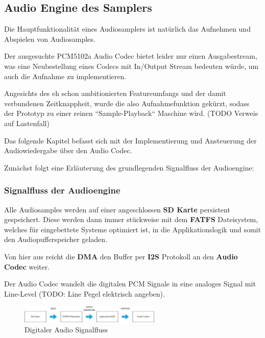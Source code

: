 



\subsection{Audio Engine des Samplers}


Die Hauptfunktionalität eines Audiosamplers ist natürlich das Aufnehmen und Abspielen von Audiosamples. 

Der ausgesuchte PCM5102a Audio Codec bietet leider nur einen Ausgabestream, was eine Neubestellung eines Codecs mit In/Output Stream bedeuten würde, um auch die Aufnahme zu implementieren.

Angesichts des eh schon ambitionierten Featureumfangs und der damit verbundenen Zeitknappheit, wurde die also Aufnahmefunktion gekürzt, sodass der Prototyp zu einer reinen ``Sample-Playback`` Maschine wird. (TODO Verweis auf Lastenfall)


Das folgende Kapitel befasst sich mit der Implementierung und Ansteuerung der Audiowiedergabe über den Audio Codec.

Zunächst folgt eine Erläuterung des grundlegenden Signalfluss der Audioengine:

\subsubsection{Signalfluss der Audioengine}

Alle Audiosamples werden auf einer angeschlossen \textbf{SD Karte} persistent gespeichert. Diese werden dann immer stückweise mit dem \textbf{FATFS} Dateisystem, welches für eingebettete Systeme optimiert ist, in die Applikationslogik und somit den Audiopufferspeicher geladen. 

Von hier aus reicht die \textbf{DMA} den Buffer per \textbf{I2S} Protokoll an den \textbf{Audio Codec} weiter. 

Der Audio Codec wandelt die digitalen PCM Signale in eine analoges Signal mit Line-Level (TODO: Line Pegel elektrisch angeben).

\begin{figure}[h!]
	\centering
	\includegraphics[width=0.6\textwidth]{images/08_durchfuehrung/audio/audio_signalflow.drawio.png}
	\caption{Digitaler Audio Signalfluss}
	\label{fig:audio_signalflow}
\end{figure}


